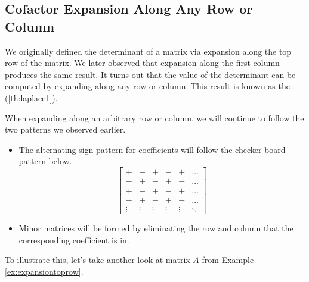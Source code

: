 \documentclass{ximera}
\begin{document}
\subsection*{Cofactor Expansion Along Any Row or Column}

We originally defined the determinant of a matrix via expansion along the top row of the matrix.  We later observed that expansion along the first column produces the same result.  It turns out that the value of the determinant can be computed by expanding along any row or column.  This result is known as the  (\ref{th:laplace1}).

When expanding along an arbitrary row or column, we will continue to follow the two patterns we observed earlier.
\begin{itemize}
    \item The alternating sign pattern for coefficients will follow the checker-board pattern below.
 $$\begin{bmatrix}+&-&+&-&+&\ldots\\-&+&-&+&-&\ldots\\
 +&-&+&-&+&\ldots\\-&+&-&+&-&\ldots\\\vdots &\vdots  & \vdots & \vdots &\vdots &\ddots \end{bmatrix}$$
 \item Minor matrices will be formed by eliminating the row and column that the corresponding coefficient is in.
\end{itemize}

To illustrate this, let's take another look at matrix $A$ from Example \ref{ex:expansiontoprow}. 
\end{document}
